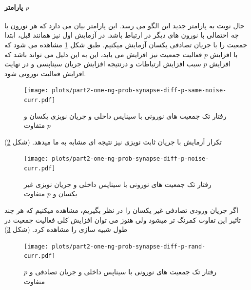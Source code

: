             \paragraph*{پارامتر $p$}
                حال نوبت به پارامتر جدید این الگو می رسد. این پارامتر  بیان می دارد که هر نورون با چه احتمالی با نورون های دیگر در ارتباط باشد. در آزمایش اول نیز همانند قبل، ابتدا جمعیت را با جریان تصادفی یکسان آزمایش میکنیم. طبق شکل 
                \ref{fig:part2-one-ng-prob-synapse-diff-p-same-noise-curr}
                مشاهده می شود که با افزایش 
                $p$ 
                فعالیت جمعیت نیز افزایش می یابد، این به این دلیل می تواند باشد که افزایش 
                $p$ 
                سبب افزایش ارتباطات و درنتیجه افزایش جریان سیناپسی و در نهایت افزایش فعالیت نورونی شود.
                \begin{figure}[!ht]
                    \centering
                    \texttt{[image: plots/part2-one-ng-prob-synapse-diff-p-same-noise-curr.pdf]} 
                    \caption{رفتار تک جمعیت های نورونی با سیناپس داخلی و جریان نویزی یکسان و $p$ متفاوت}
                    \label{fig:part2-one-ng-prob-synapse-diff-p-same-noise-curr}
                \end{figure}
                تکرار آزمایش با جریان ثابت نویزی نیز نتیجه ای مشابه به ما میدهد.
                (شکل \ref{fig:part2-one-ng-prob-synapse-diff-p-noise-curr})
                \begin{figure}[!ht]
                    \centering
                    \texttt{[image: plots/part2-one-ng-prob-synapse-diff-p-noise-curr.pdf]} 
                    \caption{رفتار تک جمعیت های نورونی با سیناپس داخلی و جریان نویزی غیر یکسان و $p$ متفاوت}
                    \label{fig:part2-one-ng-prob-synapse-diff-p-noise-curr}
                \end{figure}

                اگر جریان ورودی تصادفی غیر یکسان را در نظر بگیریم، مشاهده میکنیم که هر چند تاثیر این تفاوت کمرنگ تر میشود ولی هنوز می توان افزایش کلی فعالیت جمعیت در طول شبیه سازی را مشاهده کرد.
                (شکل \ref{fig:part2-one-ng-prob-synapse-diff-p-rand-curr})
                \begin{figure}[!ht]
                    \centering
                    \texttt{[image: plots/part2-one-ng-prob-synapse-diff-p-rand-curr.pdf]} 
                    \caption{رفتار تک جمعیت های نورونی با سیناپس داخلی و جریان تصادفی و $p$ متفاوت}
                    \label{fig:part2-one-ng-prob-synapse-diff-p-rand-curr}
                \end{figure}

